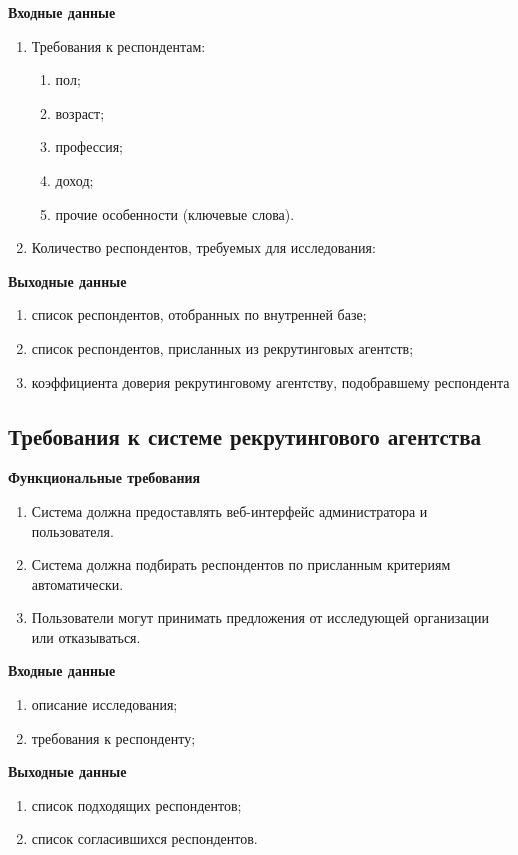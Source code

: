 \textbf{Входные данные}
\begin{enumerate}
\item Требования к респондентам:
\begin{enumerate}
\item пол;
\item возраст;
\item профессия;
\item доход;
\item прочие особенности (ключевые слова).
\end{enumerate}
\item Количество респондентов, требуемых для исследования:
\end{enumerate}

\textbf{Выходные данные}
\begin{enumerate}
\item список респондентов, отобранных по внутренней базе;
\item список респондентов, присланных из рекрутинговых агентств;
\item коэффициента доверия рекрутинговому агентству, подобравшему респондента
\end{enumerate}

\subsection{Требования к системе рекрутингового агентства}

\textbf{Функциональные требования}
\begin{enumerate}
\item Система должна предоставлять веб-интерфейс администратора и пользователя.
\item Система должна подбирать респондентов по присланным критериям автоматически.
\item Пользователи могут принимать предложения от исследующей организации или отказываться.
\end{enumerate}

\textbf{Входные данные}
\begin{enumerate}
\item описание исследования;
\item требования к респонденту;
\end{enumerate}

\textbf{Выходные данные}
\begin{enumerate}
\item список подходящих респондентов;
\item список согласившихся респондентов.
\end{enumerate}

